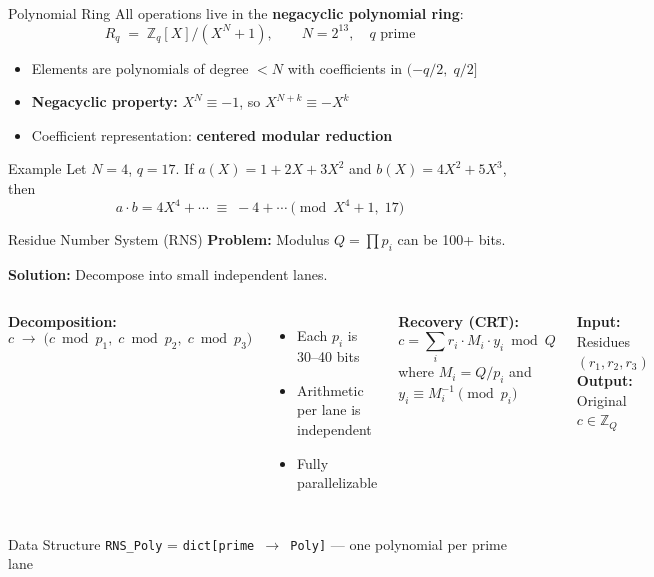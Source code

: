 \documentclass[aspectratio=169, 11pt]{beamer}
\begin{document}
\begin{frame}{Polynomial Ring}
All operations live in the \textbf{negacyclic polynomial ring}:
\[
    R_q \;=\; \mathbb{Z}_q[X]\big/\!\left(X^N + 1\right), \qquad N = 2^{13},\quad q \text{ prime}
\]

\begin{itemize}
    \item Elements are polynomials of degree $< N$ with coefficients in $(-q/2,\; q/2]$
    \item \textbf{Negacyclic property:} $X^N \equiv -1$, so $X^{N+k} \equiv -X^k$
    \item Coefficient representation: \textbf{centered modular reduction}
\end{itemize}

\vspace{0.5em}
\begin{block}{Example}
Let $N=4$, $q=17$. If $a(X) = 1 + 2X + 3X^2$ and $b(X) = 4X^2 + 5X^3$, then
\[
    a \cdot b = 4X^4 + \cdots \;\equiv\; -4 + \cdots \pmod{X^4+1,\; 17}
\]
\end{block}
\end{frame}

\begin{frame}{Residue Number System (RNS)}
\textbf{Problem:} Modulus $Q = \prod p_i$ can be 100+ bits.

\textbf{Solution:} Decompose into small independent lanes.

\vspace{0.5em}
\begin{columns}[T]
\textbf{Decomposition:}
\[
    c \;\longrightarrow\; \bigl(c \bmod p_1,\; c \bmod p_2,\; c \bmod p_3\bigr)
\]
\begin{itemize}
    \item Each $p_i$ is 30--40 bits
    \item Arithmetic per lane is independent
    \item Fully parallelizable
\end{itemize}

\textbf{Recovery (CRT):}
\[
    c = \sum_{i} r_i \cdot M_i \cdot y_i \bmod Q
\]
where $M_i = Q/p_i$ and $y_i \equiv M_i^{-1} \pmod{p_i}$

\vspace{0.5em}
\textbf{Input:} Residues $(r_1, r_2, r_3)$\\
\textbf{Output:} Original $c \in \mathbb{Z}_Q$
\end{columns}

\vspace{0.5em}
\begin{block}{Data Structure}
\texttt{RNS\_Poly} = \texttt{dict[prime $\to$ Poly]} \;---\; one polynomial per prime lane
\end{block}
\end{frame}
\end{document}
